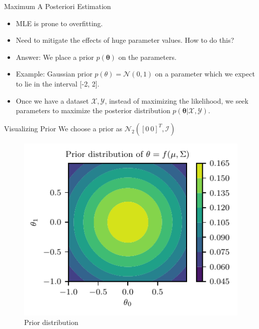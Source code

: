 \documentclass{beamer}
\begin{document}
\begin{frame}{Maximum A Posteriori Estimation}
\begin{itemize}[<+->]
\item MLE is prone to overfitting.
\item Need to mitigate the effects of huge parameter values. How to do this?
\item Answer: We place a prior $p(\boldsymbol{\theta})$ on the parameters.
\item Example: Gaussian prior $p(\theta) = \mathcal{N}(0, 1)$ on a parameter which we expect to lie in the interval [-2, 2]. 
\item Once we have a dataset $\mathcal{X}, \mathcal{Y}$, instead of maximizing the likelihood, we seek parameters to maximize the posterior distribution $p(\boldsymbol{\theta}|\mathcal{X}, \mathcal{Y})$.
\end{itemize}
\end{frame}

\begin{frame}{Visualizing Prior}
We choose a prior as $\mathcal{N}_2([0 ~ 0]^T, \mathcal{I})$
\begin{figure}
	\centering
	\includegraphics{../../notebooks/bayesian-linear-prior}
	\caption{Prior distribution}
	\label{fig:bayesian-linear-dataset}
\end{figure}
\end{frame}
\end{document}
